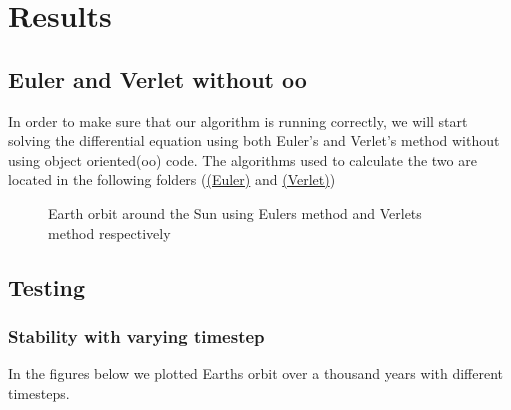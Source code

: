\documentclass[../main.tex]{subfiles}
\begin{document}
\section{Results}\label{results}
\subsection{Euler and Verlet without oo}
In order to make sure that our algorithm is running correctly, we will start solving the differential equation using both Euler's and Verlet's method without using object oriented(oo) code. The algorithms used to calculate the two are located in the following folders (\href{https://github.com/kmaasrud/Project-5/tree/master/code/Earth-Sun_Euler-FWD}{(Euler)} and \href{https://github.com/kmaasrud/Project-5/tree/master/code/Earth-Sun_Verlet}{(Verlet)})

\begin{figure}[!h]
  \centering
  \caption{Earth orbit around the Sun using Eulers method and Verlets method respectively }
  \label{fig:EarthOrbit_Euler_Verlet}
\end{figure}




\subsection{Testing}
\subsubsection{Stability with varying timestep} \label{sec:results-test-timestep}
In the figures below we plotted Earths orbit over a thousand years with different timesteps.
\end{document}
